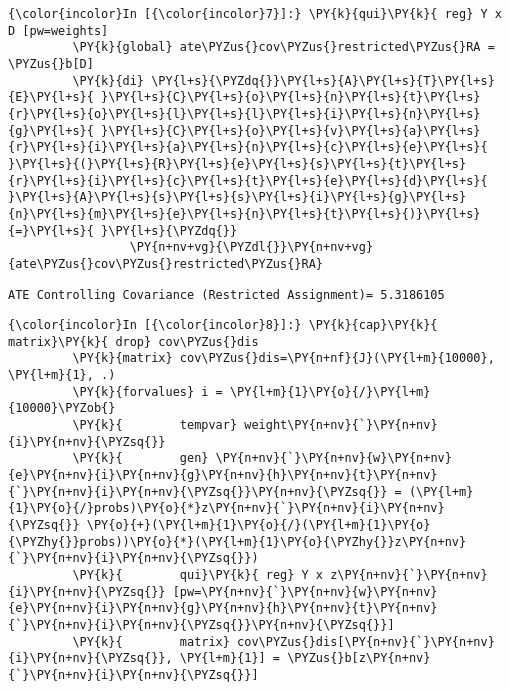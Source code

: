 \documentclass[11pt,notitlepage]{article}\usepackage[]{graphicx}\usepackage[]{color}
\makeatletter
\newenvironment{kframe}{%
 \def\at@end@of@kframe{}%
 \ifinner\ifhmode%
  \def\at@end@of@kframe{\end{minipage}}%
  \begin{minipage}{\columnwidth}%
 \fi\fi%
 \def\FrameCommand##1{\hskip\@totalleftmargin \hskip-\fboxsep
 \colorbox{shadecolor}{##1}\hskip-\fboxsep
     \hskip-\linewidth \hskip-\@totalleftmargin \hskip\columnwidth}%
 \MakeFramed {\advance\hsize-\width
   \@totalleftmargin\z@ \linewidth\hsize
   \@setminipage}}%
 {\par\unskip\endMakeFramed%
 \at@end@of@kframe}
\newenvironment{knitrout}{}{} %
\makeatother
\begin{document}
\begin{enumerate}[a)]
\begin{knitrout}
\color{fgcolor}\begin{kframe}
    \begin{Verbatim}[commandchars=\\\{\}]
{\color{incolor}In [{\color{incolor}7}]:} \PY{k}{qui}\PY{k}{ reg} Y x D [pw=weights]
         \PY{k}{global} ate\PYZus{}cov\PYZus{}restricted\PYZus{}RA = \PYZus{}b[D]
         \PY{k}{di} \PY{l+s}{\PYZdq{}}\PY{l+s}{A}\PY{l+s}{T}\PY{l+s}{E}\PY{l+s}{ }\PY{l+s}{C}\PY{l+s}{o}\PY{l+s}{n}\PY{l+s}{t}\PY{l+s}{r}\PY{l+s}{o}\PY{l+s}{l}\PY{l+s}{l}\PY{l+s}{i}\PY{l+s}{n}\PY{l+s}{g}\PY{l+s}{ }\PY{l+s}{C}\PY{l+s}{o}\PY{l+s}{v}\PY{l+s}{a}\PY{l+s}{r}\PY{l+s}{i}\PY{l+s}{a}\PY{l+s}{n}\PY{l+s}{c}\PY{l+s}{e}\PY{l+s}{ }\PY{l+s}{(}\PY{l+s}{R}\PY{l+s}{e}\PY{l+s}{s}\PY{l+s}{t}\PY{l+s}{r}\PY{l+s}{i}\PY{l+s}{c}\PY{l+s}{t}\PY{l+s}{e}\PY{l+s}{d}\PY{l+s}{ }\PY{l+s}{A}\PY{l+s}{s}\PY{l+s}{s}\PY{l+s}{i}\PY{l+s}{g}\PY{l+s}{n}\PY{l+s}{m}\PY{l+s}{e}\PY{l+s}{n}\PY{l+s}{t}\PY{l+s}{)}\PY{l+s}{=}\PY{l+s}{ }\PY{l+s}{\PYZdq{}} 
        		 \PY{n+nv+vg}{\PYZdl{}}\PY{n+nv+vg}{ate\PYZus{}cov\PYZus{}restricted\PYZus{}RA}
\end{Verbatim}

    \begin{Verbatim}[commandchars=\\\{\}]
ATE Controlling Covariance (Restricted Assignment)= 5.3186105
    \end{Verbatim}

    \begin{Verbatim}[commandchars=\\\{\}]
{\color{incolor}In [{\color{incolor}8}]:} \PY{k}{cap}\PY{k}{ matrix}\PY{k}{ drop} cov\PYZus{}dis
         \PY{k}{matrix} cov\PYZus{}dis=\PY{n+nf}{J}(\PY{l+m}{10000}, \PY{l+m}{1}, .)        
         \PY{k}{forvalues} i = \PY{l+m}{1}\PY{o}{/}\PY{l+m}{10000}\PYZob{}
         \PY{k}{		tempvar} weight\PY{n+nv}{`}\PY{n+nv}{i}\PY{n+nv}{\PYZsq{}}
         \PY{k}{		gen} \PY{n+nv}{`}\PY{n+nv}{w}\PY{n+nv}{e}\PY{n+nv}{i}\PY{n+nv}{g}\PY{n+nv}{h}\PY{n+nv}{t}\PY{n+nv}{`}\PY{n+nv}{i}\PY{n+nv}{\PYZsq{}}\PY{n+nv}{\PYZsq{}} = (\PY{l+m}{1}\PY{o}{/}probs)\PY{o}{*}z\PY{n+nv}{`}\PY{n+nv}{i}\PY{n+nv}{\PYZsq{}} \PY{o}{+}(\PY{l+m}{1}\PY{o}{/}(\PY{l+m}{1}\PY{o}{\PYZhy{}}probs))\PY{o}{*}(\PY{l+m}{1}\PY{o}{\PYZhy{}}z\PY{n+nv}{`}\PY{n+nv}{i}\PY{n+nv}{\PYZsq{}})
         \PY{k}{		qui}\PY{k}{ reg} Y x z\PY{n+nv}{`}\PY{n+nv}{i}\PY{n+nv}{\PYZsq{}} [pw=\PY{n+nv}{`}\PY{n+nv}{w}\PY{n+nv}{e}\PY{n+nv}{i}\PY{n+nv}{g}\PY{n+nv}{h}\PY{n+nv}{t}\PY{n+nv}{`}\PY{n+nv}{i}\PY{n+nv}{\PYZsq{}}\PY{n+nv}{\PYZsq{}}]		
         \PY{k}{		matrix} cov\PYZus{}dis[\PY{n+nv}{`}\PY{n+nv}{i}\PY{n+nv}{\PYZsq{}}, \PY{l+m}{1}] = \PYZus{}b[z\PY{n+nv}{`}\PY{n+nv}{i}\PY{n+nv}{\PYZsq{}}]
         

\end{Verbatim}
\end{kframe}
\end{knitrout}
\end{enumerate}
\end{document}

